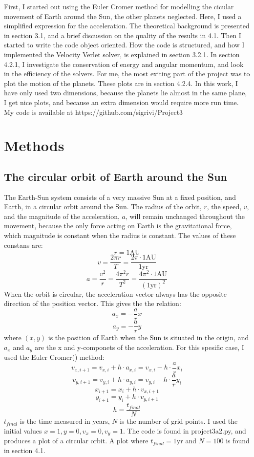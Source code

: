\documentclass{article}
\begin{document}
First, I started out using the Euler Cromer method for modelling the cicular movement of Earth around the Sun, the other planets neglected. Here, I used a simplified expression for the acceleration. The theoretical background is presented in section 3.1, and a brief discussion on the quality of the results in 4.1. Then I started to write the code object oriented. How the code is structured, and  how I implemented the Velocity Verlet solver, is explained in section 3.2.1. In section 4.2.1, I investigate the conservation of energy and angular momentum, and look in the efficiency of the solvers. 
For me, the most exiting part of the project was to plot the motion of the planets. These plots are in section 4.2.4. 
In this work, I have only used two dimensions, because the planets lie almost in the same plane, I get nice plots, and because an extra dimension would require more run time. 
My code is available at https://github.com/sigrivi/Project3
\section{Methods}
\subsection{The circular orbit of Earth around the Sun}
The Earth-Sun system consists of a very massive Sun at a fixed position, and Earth, in a circular orbit around the Sun. The radius of the orbit, $r$, the speed, $v$, and the magnitude of the acceleration, $a$, will remain unchanged throughout the movement, because the only force acting on Earth is the gravitational force, which magnitude is constant when the radius is constant. The values of these constans are: 
$$r=1\textrm{AU}$$
$$v=\frac{2{\pi}r}{T} = \frac{2 \pi \cdot 1\textrm{AU}}{1 \textrm{yr}}$$
$$a=\frac{v^2}{r} = \frac{4{\pi}^2r}{T^2} = \frac{4 {\pi}^2 \cdot 1\textrm{AU}}{(1 \textrm{yr})^2}$$
When the orbit is circular, the acceleration vector always has the opposite direction of the position vector. This gives the the relation: 
$$a_x = -\frac{a}{r}x$$
$$a_y = -\frac{a}{r}y$$
where $(x,y)$ is the position of Earth when the Sun is situated in the origin, and $a_x$ and $a_y$ are the x and y-componets of the acceleration. For this spesific case, I used the Euler Cromer(\cite{EulerCromer}) method: 
$$v_{x,i+1} =v_{x,i} + h\cdot a_{x,i} = v_{x,i} - h\cdot \frac{a}{r}x_i$$
$$v_{y,i+1} =v_{y,i} + h\cdot a_{y,i}= v_{y,i} - h\cdot \frac{a}{r}y_i$$
$$x_{i+1} = x_i + h \cdot v_{x,i+1}$$
$$y_{i+1} = y_i + h\cdot v_{y,i+1}$$
$$h = \frac{t_{final}}{N}$$ 
$t_{final}$ is the time measured in years, $N$ is the number of grid points. I used the initial values $x=1, y=0, v_x=0, v_y=1$.
The code is found in project3a2.py, and produces a plot of a circular orbit. A plot where $t_{final}=1\textrm{yr}$ and $N=100$ is found in section 4.1. %
\end{document}
